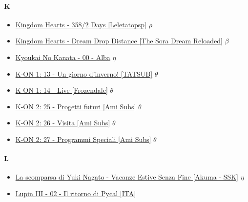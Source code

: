 		
		\paragraph{K} \hypertarget{OK}{}
			\begin{itemize}
				
				\item \href{https://mega.nz/#!MNB1AA6Y!pNgSzZgtTLnsBgCkLrYzfyyXXh8vLAsvjjVh0dSBaTM} {Kingdom Hearts - 358/2 Days [Leletatopsp]}  $\rho$   \\ 
				\item \href{https://mega.nz/#F!xtZyyDTI!dr2uUsaImy2Zbv3Ev0ASXg} {Kingdom Hearts - Dream Drop Distance [The Sora Dream Reloaded]}  $\beta$   \\ 
				\item \href{https://mega.nz/#!IQcQmbiS!nmZtgdXCevur1WuwIM2DnttHKRAuUjY7w-H9q52hbKI} {Kyoukai No Kanata - 00 - Alba}  $\eta$   \\
				\item \href{https://mega.nz/#!d5NhmT7B!A7oMLGI_YxwJ7_MMR7QM_DasiBddtSfsUHKs0CVeJ6c} {K-ON 1: 13 - Un giorno d'inverno! [TATSUB]}  $\theta$   \\
				\item \href{https://mega.nz/#!xlcAUIoD!Nb41nOrmFOCD4II2LrOPH6mZMtVmeiWKCxQsop_9aHE} {K-ON 1: 14 - Live [Frozendale]}  $\theta$   \\ 
				\item \href{https://mega.nz/#!o1s1QI6C!SkVhofqBQ4_AinhHwyUThTN1iHkAxTZGN9dWpYFbClo}
				 {K-ON 2: 25 - Progetti futuri [Ami Subs]}  $\theta$   \\
				\item \href{https://mega.nz/#!lp1AyYxK!OXkte8mQEa13L6RWr_50jojJB4hoEe_QnJYb4DtkWTY} {K-ON 2: 26 - Visita [Ami Subs]}  $\theta$   \\
				\item \href{https://mega.nz/#!h0UySaDa!N5UCU0sZOuvSC5cHDWecikA7jtg4iL8y42ZAqzr7Nxo} {K-ON 2: 27 - Programmi Speciali [Ami Subs]}  $\theta$   \\
				
			
			\end{itemize}
		
		
		\paragraph{L} \hypertarget{OL}{}
			\begin{itemize}
				\item \href{https://mega.nz/#!wZVhVRgB!X93GlK53J9v3w3Lqr_2G3XKu0Lf_dOh3EA6NOhPaWec} {La scomparsa di Yuki Nagato - Vacanze Estive Senza Fine [Akuma - SSK]} $\eta$ \\  
				\item \href{} {Lupin III - 02 - Il ritorno di Pycal [ITA]}  \\  
	
			\end{itemize}	
		
